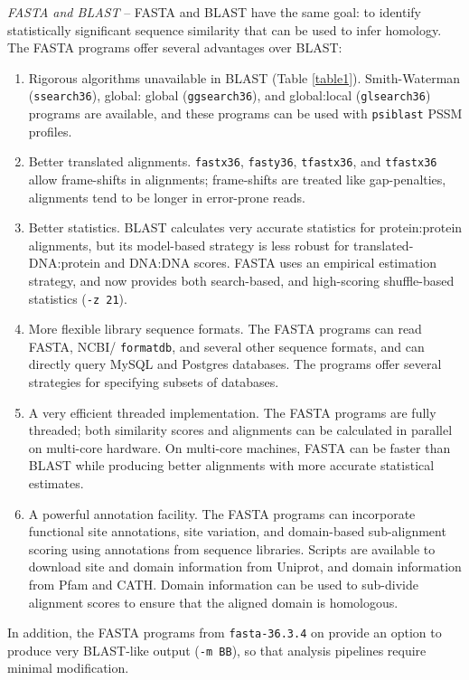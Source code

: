 \documentclass[11pt]{article}
\begin{document}
\emph{FASTA and BLAST} -- FASTA and BLAST have the same goal: to
identify statistically significant sequence similarity that can be
used to infer homology.  The FASTA programs offer several advantages
over BLAST:
\begin{enumerate}
\item
Rigorous algorithms unavailable in BLAST (Table \ref{table1}).  Smith-Waterman
(\texttt{ssearch36}), global: global (\texttt{ggsearch36}), and
global:local (\texttt{glsearch36}) programs are available, and these
programs can be used with \texttt{psiblast} PSSM profiles.
\item
Better translated alignments. \texttt{fastx36}, \texttt{fasty36},
\texttt{tfastx36}, and \texttt{tfastx36} allow frame-shifts in
alignments; frame-shifts are treated like gap-penalties, alignments
tend to be longer in error-prone reads.
\item
Better statistics. BLAST calculates very accurate statistics for
protein:protein alignments, but its model-based strategy is less
robust for translated-DNA:protein and DNA:DNA scores.  FASTA uses an
empirical estimation strategy, and now provides both search-based, and
high-scoring shuffle-based statistics (\texttt{-z 21}).
\item
More flexible library sequence formats.  The FASTA programs can read
FASTA, NCBI/ \texttt{formatdb}, and several other sequence formats, and can
directly query MySQL and Postgres databases. The programs offer
several strategies for specifying subsets of databases.
\item
A very efficient threaded implementation.  The FASTA programs are
fully threaded; both similarity scores and alignments can be
calculated in parallel on multi-core hardware.  On multi-core
machines, FASTA can be faster than BLAST while producing better
alignments with more accurate statistical estimates.
\item
  A powerful annotation facility.  The FASTA programs can incorporate
  functional site annotations, site variation, and domain-based
  sub-alignment scoring using annotations from sequence libraries.
  Scripts are available to download site and domain information from
  Uniprot, and domain information from Pfam and CATH.  Domain
  information can be used to sub-divide alignment scores to ensure
  that the aligned domain is homologous.

\end{enumerate}

In addition, the FASTA programs from \texttt{fasta-36.3.4} on provide
an option to produce very BLAST-like output (\texttt{-m BB}), so that
analysis pipelines require minimal modification.
\end{document}
